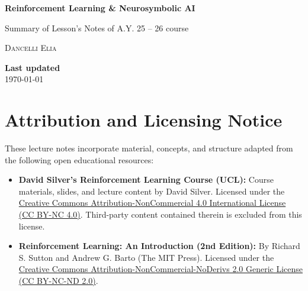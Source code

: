 \documentclass[a4paper,11pt]{article}
\theoremstyle{spaced}
\begin{document}
\begin{titlepage}
    \centering

    \vspace*{3cm}

    {\Huge \bfseries Reinforcement Learning \& Neurosymbolic AI\par}
    \vspace{0.4cm}
    {\Large Summary of Lesson's Notes of A.Y. 25 -- 26 course\par}

    \vfill

    \begin{flushleft}
        \textsc{Dancelli Elia}\\
    \end{flushleft}

    \vspace{1cm}

    \begin{flushright}
        \textbf{Last updated}\\
        \today
    \end{flushright}

\end{titlepage}

\section*{Attribution and Licensing Notice}

These lecture notes incorporate material, concepts, and structure adapted from the following open educational resources:

\begin{itemize}
    \item \textbf{David Silver's Reinforcement Learning Course (UCL):} 
    Course materials, slides, and lecture content by David Silver. 
    Licensed under the \href{https://creativecommons.org/licenses/by-nc/4.0/}{Creative Commons Attribution-NonCommercial 4.0 International License (CC BY-NC 4.0)}. Third-party content contained therein is excluded from this license.
    
    \item \textbf{Reinforcement Learning: An Introduction (2nd Edition):} 
    By Richard S. Sutton and Andrew G. Barto (The MIT Press). 
    Licensed under the \href{https://creativecommons.org/licenses/by-nc-nd/2.0/}{Creative Commons Attribution-NonCommercial-NoDerivs 2.0 Generic License (CC BY-NC-ND 2.0)}.
\end{itemize}
\end{document}
